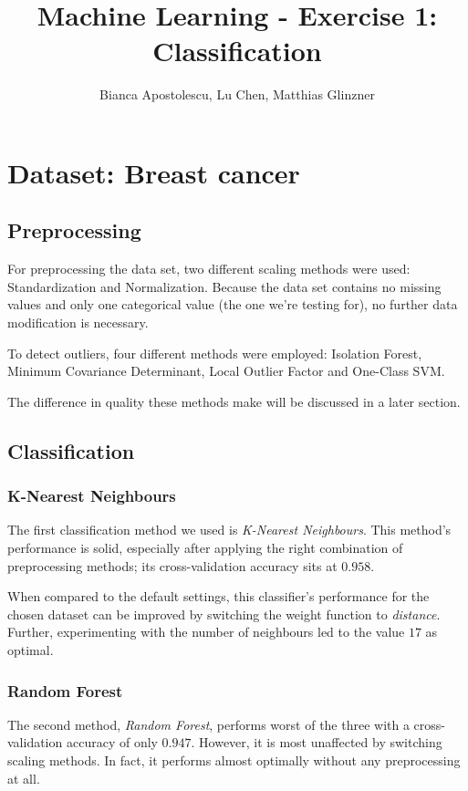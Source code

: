 \documentclass{article}
\begin{document}
\title{Machine Learning - Exercise 1: Classification}
\author{Bianca Apostolescu, Lu Chen, Matthias Glinzner}
\date{}
\maketitle

\section*{Dataset: Breast cancer}
\subsection*{Preprocessing}
For preprocessing the data set, two different scaling methods were used: Standardization and Normalization.
Because the data set contains no missing values and only one categorical value (the one we're testing for), no further data modification is necessary.

To detect outliers, four different methods were employed: Isolation Forest, Minimum Covariance Determinant, Local Outlier Factor and One-Class SVM.

The difference in quality these methods make will be discussed in a later section.

\subsection*{Classification}
\subsubsection*{K-Nearest Neighbours}
The first classification method we used is \textit{K-Nearest Neighbours}.
This method's performance is solid, especially after applying the right combination of preprocessing methods;
its cross-validation accuracy sits at $0.958$.

When compared to the default settings, this classifier's performance for the chosen dataset can be improved by switching the weight function to \textit{distance}.
Further, experimenting with the number of neighbours led to the value $17$ as optimal.

\subsubsection*{Random Forest}
The second method, \textit{Random Forest}, performs worst of the three with a cross-validation accuracy of only $0.947$.
However, it is most unaffected by switching scaling methods.
In fact, it performs almost optimally without any preprocessing at all.
\end{document}
